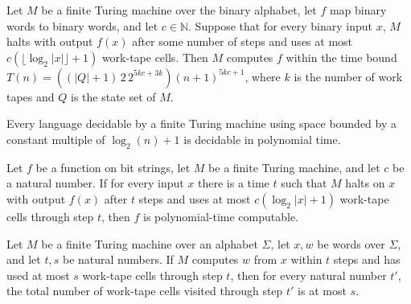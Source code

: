 \begin{theorem}
\label{Turing.FinTM.ComputesInSpace.computesFunInTime}
\leanok
{}
Let $M$ be a finite Turing machine over the binary alphabet, let $f$ map binary words to
binary words, and let $c\in\mathbb{N}$. Suppose that for every binary input $x$, $M$
halts with output $f(x)$ after some number of steps and uses at most $c(\lfloor\log_2
|x|\rfloor+1)$ work-tape cells. Then $M$ computes $f$ within the time bound
$T(n)=((|Q|+1)\,2\,2^{5kc+3k})(n+1)^{5kc+1}$, where $k$ is the number of work tapes and
$Q$ is the state set of $M$.
\end{theorem}

\begin{theorem}
\label{Complexity.LOGSPACE_subset_P}
\leanok
{}
Every language decidable by a finite Turing machine using space bounded by a constant
multiple of $\log_2(n)+1$ is decidable in polynomial time.
\end{theorem}

\begin{theorem}
\label{Complexity.polyTimeComputable_of_computesInSpace}
\leanok
{}
Let $f$ be a function on bit strings, let $M$ be a finite Turing machine, and let $c$ be
a natural number. If for every input $x$ there is a time $t$ such that $M$ halts on $x$
with output $f(x)$ after $t$ steps and uses at most $c(\log_2 |x|+1)$ work-tape cells
through step $t$, then $f$ is polynomial-time computable.
\end{theorem}

\begin{theorem}
\label{Turing.FinTM.ComputesInTime.spaceUsed_le_of_halt}
\leanok
{}
Let $M$ be a finite Turing machine over an alphabet $\Sigma$, let $x,w$ be words over
$\Sigma$, and let $t,s$ be natural numbers. If $M$ computes $w$ from $x$ within $t$
steps and has used at most $s$ work-tape cells through step $t$, then for every natural
number $t'$, the total number of work-tape cells visited through step $t'$ is at most
$s$.
\end{theorem}

